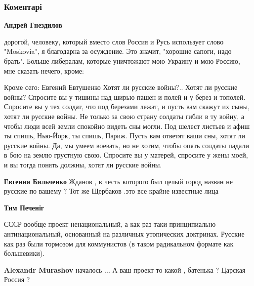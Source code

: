  
 
 
 
 
\subsubsection{Коментарі}

\begin{itemize} %
\textbf{Андрей Гнездилов} 

дорогой, человеку, который вместо слов Россия и Русь использует слово
"Moskovia", я благодарна за осуждение. Это значит, "хорошие сапоги, надо
брать". Больше либералам, которые уничтожают мою Украину и мою Россию, мне
сказать нечего, кроме:


\obeycr
Кроме сего: Евгений Евтушенко
Хотят ли русские войны?..
Хотят ли русские войны?
Спросите вы у тишины
над ширью пашен и полей
и у берез и тополей.
Спросите вы у тех солдат,
что под березами лежат,
и пусть вам скажут их сыны,
хотят ли русские войны.
Не только за свою страну
солдаты гибли в ту войну,
а чтобы люди всей земли
спокойно видеть сны могли.
Под шелест листьев и афиш
ты спишь, Нью-Йорк, ты спишь, Париж.
Пусть вам ответят ваши сны,
хотят ли русские войны.
Да, мы умеем воевать,
но не хотим, чтобы опять
солдаты падали в бою
на землю грустную свою.
Спросите вы у матерей,
спросите у жены моей,
и вы тогда понять должны,
хотят ли русские войны.
\restorecr

\begin{itemize} %
\textbf{Евгения Бильченко} Жданов , в честь которого был целый город назван не русские по вашему ? Тот же Щербаков .это все крайне известные лица

\textbf{Тим Печеніг} 

СССР вообще проект ненациональный, а как раз таки принципиально
антинациональный, основанный на различных утопических доктринах. Русские как раз
были тормозом для коммунистов (в таком радикальном формате как большевики).


\textbf{Alexandr Murashov} началось ... А ваш проект то какой , батенька ? Царская Россия ?


\end{itemize}
\end{itemize}
